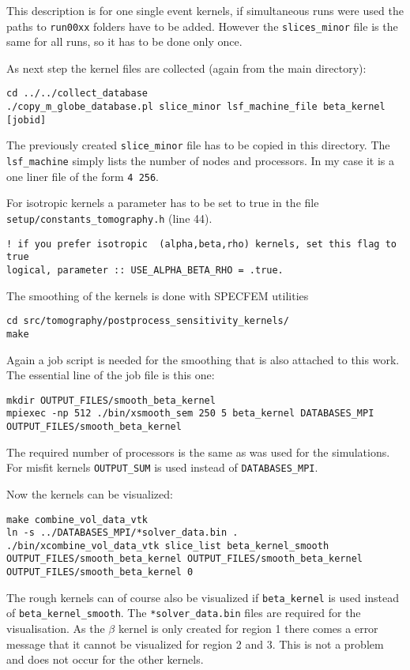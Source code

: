 This description is for one single event kernels, if simultaneous runs were used
the paths to \texttt{run00xx} folders have to be added. 
However the \texttt{slices\_minor} file is the same for all runs, so it has to be 
done only once.

As next step the kernel files are collected (again from the main directory):
\begin{lstlisting} 
cd ../../collect_database
./copy_m_globe_database.pl slice_minor lsf_machine_file beta_kernel [jobid]
\end{lstlisting}

The previously created \texttt{slice\_minor} file has to be copied in this
directory. The \texttt{lsf\_machine} simply lists the number of nodes and processors. In my case it is a one liner file of the form \texttt{4 256}.

For isotropic kernels a parameter has to be set to true in the file 
\texttt{setup/constants\_tomography.h} (line 44).
\begin{lstlisting}
! if you prefer isotropic  (alpha,beta,rho) kernels, set this flag to true
logical, parameter :: USE_ALPHA_BETA_RHO = .true.
\end{lstlisting}

The smoothing of the kernels is done with SPECFEM utilities
\begin{lstlisting} 
cd src/tomography/postprocess_sensitivity_kernels/
make
\end{lstlisting}

Again a job script is needed for the smoothing that is also attached to this work.
The essential line of the job file is this one:
\begin{lstlisting} 
mkdir OUTPUT_FILES/smooth_beta_kernel
mpiexec -np 512 ./bin/xsmooth_sem 250 5 beta_kernel DATABASES_MPI OUTPUT_FILES/smooth_beta_kernel
\end{lstlisting}
The required number of processors is the same as was used for the simulations.
For misfit kernels \texttt{OUTPUT\_SUM} is used instead of \texttt{DATABASES\_MPI}.

Now the kernels can be visualized:
\begin{lstlisting} 
make combine_vol_data_vtk
ln -s ../DATABASES_MPI/*solver_data.bin .
./bin/xcombine_vol_data_vtk slice_list beta_kernel_smooth OUTPUT_FILES/smooth_beta_kernel OUTPUT_FILES/smooth_beta_kernel OUTPUT_FILES/smooth_beta_kernel 0
\end{lstlisting}

The rough kernels can of course also be visualized if 
\texttt{beta\_kernel} is used instead of \texttt{beta\_kernel\_smooth}.
The \texttt{*solver\_data.bin} files are required for the visualisation.
As the $\beta$ kernel is only created for region 1 there comes a error message that 
it cannot be visualized for region 2 and 3. This is not a problem and does not occur
for the other kernels.

